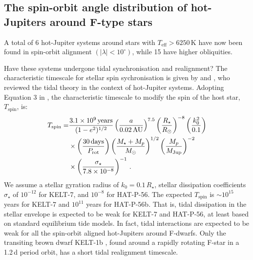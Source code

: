 \documentclass[useAMS,usenatbib]{mn2e}
\begin{document}
\subsection{The spin-orbit angle distribution of hot-Jupiters around F-type stars}
\label{sec:stats}

A total of 6 hot-Jupiter systems around stars with $T_\text{eff} > 6250\,\text{K}$ have now been found in spin-orbit alignment $(|\lambda| < 10^\circ)$, while 15 have higher obliquities.

Have these systems undergone tidal synchronisation and realignment? The characteristic timescale for stellar spin sychronisation is given by \citet{2010ApJ...723..285H} and \citet{2012ApJ...757....6H}, who reviewed the tidal theory in the context of hot-Jupiter systems. Adopting Equation 3 in \citet{2010ApJ...723..285H}, the characteristic timescale to modify the spin of the host star, $T_\text{spin}$, is:
\begin{align}
  T_\text{spin} =& \frac{3.1\times10^9\,\text{years}}{(1-e^2)^{1/2}} \left(\frac{a}{0.02 \,\text{AU}} \right)^{7.5} \left( \frac{R_\star}{R_\odot}\right)^{-8} \left( \frac{k_0^2}{0.1} \right) \notag\\
  &\times \left( \frac{30 \,\text{days}}{P_\text{rot}} \right) \left(\frac{M_\star + M_p}{M_\odot} \right)^{1/2} \left(\frac{M_p}{M_\text{Jup}} \right)^{-2} \notag\\
  &\times \left( \frac{\sigma_\star}{7.8\times10^{-8}} \right)^{-1}\,.
\end{align}
We assume a stellar gyration radius of $k_0=0.1\,R_\star$, stellar dissipation coefficients $\sigma_\star$ of $10^{-12}$ for KELT-7, and $10^{-8}$ for  HAT-P-56. The expected $T_\text{spin}$ is $\sim 10^{15}$ years for KELT-7 and $10^{11}$ years for HAT-P-56b. That is, tidal dissipation in the stellar envelope is expected to be weak for KELT-7 and HAT-P-56, at least based on standard equilibrium tide models. In fact, tidal interactions are expected to be weak for all the spin-orbit aligned hot-Jupiters around F-dwarfs. Only the transiting brown dwarf KELT-1b \citep{2012ApJ...761..123S}, found around a rapidly rotating F-star in a 1.2\,d period orbit, has a short tidal realignment timescale. 
\end{document}
